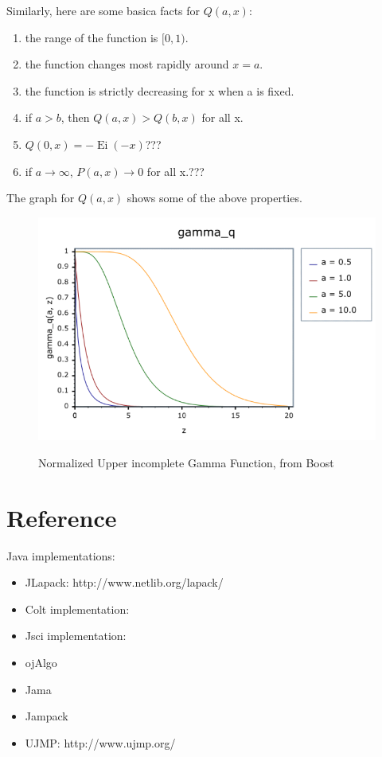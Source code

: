 Similarly, here are some basica facts for $Q(a, x)$:
\begin{enumerate}
\item the range of the function is $[0, 1)$.
\item the function changes most rapidly around $x = a$.
\item the function is strictly decreasing for x when a is fixed.
\item if $a > b$, then $Q(a, x) > Q(b, x)$ for all x.
\item $Q(0, x) = - \operatorname{Ei}(-x)$???
\item if $a \rightarrow \infty$, $P(a, x) \rightarrow 0$ for all x.???
\end{enumerate}
The graph for $Q(a, x)$ shows some of the above properties.
\begin{figure}[htp]
\begin{center}
{
\includegraphics[bb=0 0 600 400,width=1\textwidth] {chap3/gammaq.png}
}
\end{center}
\caption{Normalized Upper incomplete Gamma Function, from Boost}
\label{figure:gammaqfunction}
\end{figure}


\section{Reference}

Java implementations:
\begin{itemize}
\item JLapack: http://www.netlib.org/lapack/
\item Colt implementation:
\item Jsci implementation:
\item ojAlgo
\item Jama
\item Jampack
\item UJMP: http://www.ujmp.org/
\end{itemize}


